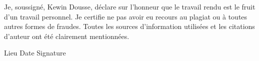 Je, soussigné, Kewin Dousse, déclare sur l’honneur que le travail rendu est le fruit d’un travail personnel. Je certifie ne pas avoir eu recours au plagiat ou à toutes autres formes de fraudes. Toutes les sources d’information utilisées et les citations d’auteur ont été clairement mentionnées.

\bigskip
\bigskip

Lieu \hfil Date \hfil Signature